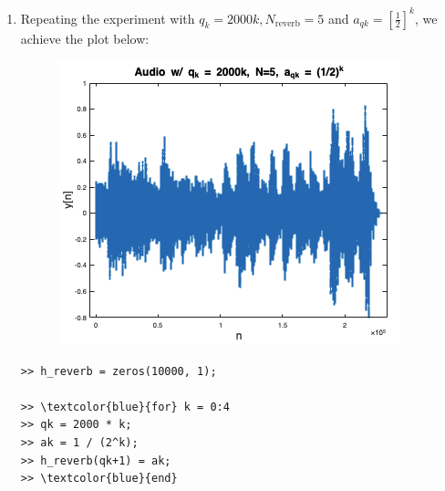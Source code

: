 \documentclass[12pt]{article}
\begin{document}
\begin{enumerate}[label=\textbf{\alph*)}, leftmargin=2.6em]
\begin{Verbatim}[frame=single, commandchars=\\\{\}]
>> reverb_audio = conv(audio_clip, h_reverb);
>> \textcolor{blue}{sound}(reverb_audio, fs);
>> \textcolor{blue}{stem}(reverb_audio, \textcolor{violet}{'.'});
>> \textcolor{blue}{title}(\textcolor{violet}{'Reverb a_{qk} = 0.7^k'}, \textcolor{violet}{'FontSize'}, 16);
>> \textcolor{blue}{xlabel}(\textcolor{violet}{'n'}, \textcolor{violet}{'FontSize'}, 16);
>> \textcolor{blue}{ylabel}(\textcolor{violet}{'y[n]'}, \textcolor{violet}{'FontSize'}, 16);
\end{Verbatim}
When compared to the original audio with reverb in part \textbf{d)}, we find that the signal has higher peaks in amplitude. It almost looks like the reverberations closely follow the original signal, even though they should, in practice, be further in distance. When listening to this sample, it sounds much more distorted as well, and is much more unpleasant to listen to \---- it more closely resembles a "chorus" effect as opposed to a reverb one, though it is important to consider that they are very similar, only different in the parameter that was changed for this example.

\item Repeating the experiment with $q_k=2000k, N_\text{reverb}=5$ and $a_{qk}=[\frac{1}{2}]^k$, we achieve the plot below:
\begin{figure}[H]
    \centering
    \includegraphics[width=0.5\linewidth]{plot5.png}
\end{figure}
\begin{Verbatim}[frame=single, commandchars=\\\{\}]
>> h_reverb = zeros(10000, 1);

>> \textcolor{blue}{for} k = 0:4
>> qk = 2000 * k;
>> ak = 1 / (2^k);
>> h_reverb(qk+1) = ak;
>> \textcolor{blue}{end}


\end{Verbatim}
\end{enumerate}
\end{document}

